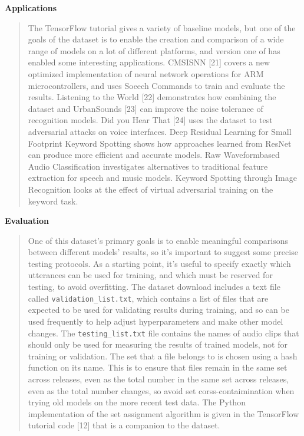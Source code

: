 \documentclass{article}
\theoremstyle{definition}
\theoremstyle{remark}
\begin{document}
\textbf{Applications}

\begin{quote}
The TensorFlow tutorial gives a variety of baseline models, but one of the goals of the dataset is to enable the creation and comparison of a wide range of models on a lot of different platforms, and version one of has enabled some interesting applications. CMSISNN [21] covers a new optimized implementation of neural network operations for ARM microcontrollers, and uses Soeech Commands to train and evaluate the results. Listening to the World [22] demonstrates how combining the dataset and UrbanSounds [23] can improve the noise tolerance of recognition models. Did you Hear That [24] uses the dataset to test adversarial attacks on voice interfaces. Deep Residual Learning for Small Footprint Keyword Spotting \cite{tang2018deep} shows how approaches learned from ResNet can produce more efficient and accurate models. Raw Waveformbased Audio Classification \cite{lee2017raw} investigates alternatives to traditional feature extraction for speech and music models. Keyword Spotting through Image Recognition \cite{gouda2018speech} looks at the effect of virtual adversarial training on the keyword task.
\end{quote}

\textbf{Evaluation}

\begin{quote}
One of this dataset's primary goals is to enable meaningful comparisons between different models' results, so it's important to suggest some precise testing protocols. As a starting point, it's useful to specify exactly which utterances can be used for training, and which must be reserved for testing, to avoid overfitting. The dataset download includes a text file called \texttt{validation\_list.txt}, which contains a list of files that are expected to be used for validating results during training, and so can be used frequently to help adjust hyperparameters and make other model changes. The \texttt{testing\_list.txt} file contains the names of audio clips that should only be used for measuring the results of trained models, not for training or validation. The set that a file belongs to is chosen using a hash function on its name. This is to ensure that files remain in the same set across releases, even as the total number in the same set across releases, even as the total number changes, so avoid set corss-contaimination when trying old models on the more recent test data. The Python implementation of the set assignment algorithm is given in the TensorFlow tutorial code [12] that is a companion to the dataset.
\end{quote}
\end{document}
